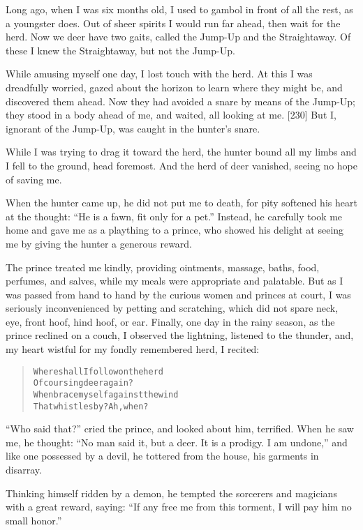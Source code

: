 \documentclass[article, twoside, 14pt]{memoir}
\renewenvironment{verbatim}{%
\begin{quote}%
\vskip -10pt%
\begin{alltt}\normalfont\large}{\end{alltt}%
\end{quote}%
\vskip -10pt
} %
\begin{document}
\label{s45}

Long ago, when I was six months old, I used to gambol in front of
all the rest, as a youngster does. Out of sheer spirits I would run
far ahead, then wait for the herd. Now we deer have two gaits,
called the Jump-Up and the Straightaway. Of these I knew the
Straightaway, but not the Jump-Up.

While amusing myself one day, I lost touch with the herd. At this I
was dreadfully worried, gazed about the horizon to learn where they
might be, and discovered them ahead. Now they had avoided a snare
by means of the Jump-Up; they stood in a body ahead of me, and
waited, all looking at me. [230] But I, ignorant of the Jump-Up,
was caught in the hunter's snare.

While I was trying to drag it toward the herd, the hunter bound all
my limbs and I fell to the ground, head foremost. And the herd of
deer vanished, seeing no hope of saving me.

When the hunter came up, he did not put me to death, for pity
softened his heart at the thought:
``He is a fawn, fit only for a pet.'' Instead, he carefully took me
home and gave me as a plaything to a prince, who showed his delight
at seeing me by giving the hunter a generous reward.

The prince treated me kindly, providing ointments, massage, baths,
food, perfumes, and salves, while my meals were appropriate and
palatable. But as I was passed from hand to hand by the curious
women and princes at court, I was seriously inconvenienced by
petting and scratching, which did not spare neck, eye, front hoof,
hind hoof, or ear. Finally, one day in the rainy season, as the
prince reclined on a couch, I observed the lightning, listened to
the thunder, and, my heart wistful for my fondly remembered herd, I
recited:

\begin{verbatim}
Where shall I follow on the herd
    Of coursing deer again?
When brace myself against the wind
    That whistles by? Ah, when?
\end{verbatim}
``Who said that?'' cried the prince, and looked about him,
terrified. When he saw me, he thought:
``No man said it, but a deer. It is a prodigy. I am undone,'' and
like one possessed by a devil, he tottered from the house, his
garments in disarray.

Thinking himself ridden by a demon, he tempted the sorcerers and
magicians with a great reward, saying:
``If any free me from this torment, I will pay him no small honor.''
\end{document}
